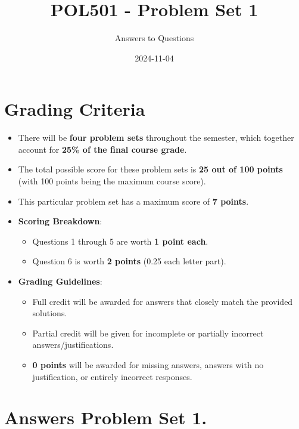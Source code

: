 \documentclass[
  11pt,
]{article}
\title{POL501 - Problem Set 1}
\author{Answers to Questions}
\date{2024-11-04}
\providecommand{\tightlist}{%
  \setlength{\itemsep}{0pt}\setlength{\parskip}{0pt}}
\begin{document}
\maketitle

{
\setcounter{tocdepth}{2}
\tableofcontents
}
\newpage

\section{Grading Criteria}\label{grading-criteria}

\begin{itemize}
\tightlist
\item
  There will be \textbf{four problem sets} throughout the semester,
  which together account for \textbf{25\% of the final course grade}.
\item
  The total possible score for these problem sets is \textbf{25 out of
  100 points} (with 100 points being the maximum course score).
\item
  This particular problem set has a maximum score of \textbf{7 points}.
\item
  \textbf{Scoring Breakdown}:

  \begin{itemize}
  \tightlist
  \item
    Questions 1 through 5 are worth \textbf{1 point each}.
  \item
    Question 6 is worth \textbf{2 points} (0.25 each letter part).
  \end{itemize}
\item
  \textbf{Grading Guidelines}:

  \begin{itemize}
  \tightlist
  \item
    Full credit will be awarded for answers that closely match the
    provided solutions.
  \item
    Partial credit will be given for incomplete or partially incorrect
    answers/justifications.
  \item
    \textbf{0 points} will be awarded for missing answers, answers with
    no justification, or entirely incorrect responses.
  \end{itemize}
\end{itemize}

\section{Answers Problem Set 1.}\label{answers-problem-set-1.}
\end{document}
